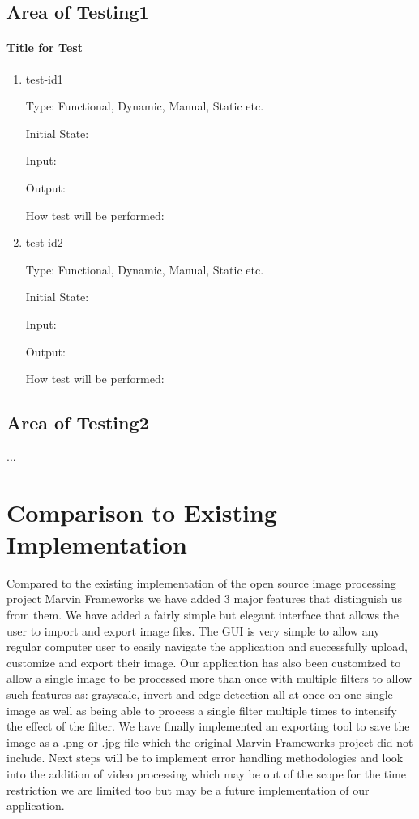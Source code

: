 \documentclass[12pt, titlepage]{article}
\begin{document}
\subsection{Area of Testing1}
		
\paragraph{Title for Test}

\begin{enumerate}

\item{test-id1\\}

Type: Functional, Dynamic, Manual, Static etc.
					
Initial State: 
					
Input: 
					
Output: 
					
How test will be performed: 
					
\item{test-id2\\}

Type: Functional, Dynamic, Manual, Static etc.
					
Initial State: 
					
Input: 
					
Output: 
					
How test will be performed: 

\end{enumerate}

\subsection{Area of Testing2}

...

	
\section{Comparison to Existing Implementation}	
			Compared to the existing implementation of the open source image processing project Marvin Frameworks we have added 3 major features that distinguish us from them. We have added a fairly simple but elegant interface that allows the user to import and export image files. The GUI is very simple to allow any regular computer user to easily navigate the application and successfully upload, customize and export their image.  Our application has also been customized to allow a single image to be processed more than once with multiple filters to allow such features as: grayscale, invert and edge detection all at once on one single image as well as being able to process a single filter multiple times to intensify the effect of the filter. We have finally implemented an exporting tool to save the image as a .png or .jpg file which the original Marvin Frameworks project did not include. Next steps will be to implement error handling methodologies and look into the addition of video processing which may be out of the scope for the time restriction we are limited too but may be a future implementation of our application.
\end{document}
